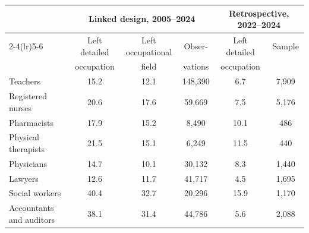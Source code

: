 \begin{tabular}{lccccc}
\toprule
 & \multicolumn{3}{c}{Linked design, 2005--2024}
 & \multicolumn{2}{c}{Retrospective, 2022--2024} \\
\cmidrule(lr){2-4}\cmidrule(lr){5-6}
 & Left detailed & Left occupational & Obser- & Left detailed & Sample \\
 & occupation & field & vations & occupation & \\
\midrule
Teachers & 15.2 & 12.1 & 148,390 & 6.7 & 7,909 \\
Registered nurses & 20.6 & 17.6 & 59,669 & 7.5 & 5,176 \\
Pharmacists & 17.9 & 15.2 & 8,490 & 10.1 & 486 \\
Physical therapists & 21.5 & 15.1 & 6,249 & 11.5 & 440 \\
Physicians & 14.7 & 10.1 & 30,132 & 8.3 & 1,440 \\
Lawyers & 12.6 & 11.7 & 41,717 & 4.5 & 1,695 \\
Social workers & 40.4 & 32.7 & 20,296 & 15.9 & 1,170 \\
Accountants and auditors & 38.1 & 31.4 & 44,786 & 5.6 & 2,088 \\
\bottomrule
\end{tabular}
